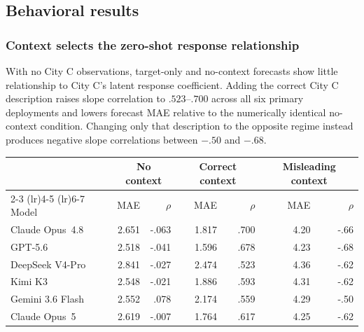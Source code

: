 \subsection{Behavioral results}
\label{app:coin-city-results}

\subsubsection{Context selects the zero-shot response relationship}

With no City C observations, target-only and no-context forecasts show little relationship to City C's latent response coefficient.
Adding the correct City C description raises slope correlation to \(.523\)--\(.700\) across all six primary deployments and lowers forecast MAE relative to the numerically identical no-context condition.
Changing only that description to the opposite regime instead produces negative slope correlations between \(-.50\) and \(-.68\).

\begin{center}
\begin{minipage}{\linewidth}
\centering
{}
\label{tab:coin-city-zero-shot}
\small
\begin{tabular}{l rr rr rr}
\toprule
& \multicolumn{2}{c}{No context} & \multicolumn{2}{c}{Correct context} & \multicolumn{2}{c}{Misleading context} \\
\cmidrule(lr){2-3}
\cmidrule(lr){4-5}
\cmidrule(lr){6-7}
Model & MAE & \(\rho\) & MAE & \(\rho\) & MAE & \(\rho\) \\
\midrule
Claude Opus~4.8 & 2.651 & -.063 & 1.817 & .700 & 4.20 & -.66 \\
GPT-5.6 & 2.518 & -.041 & 1.596 & .678 & 4.23 & -.68 \\
DeepSeek V4-Pro & 2.841 & -.027 & 2.474 & .523 & 4.36 & -.62 \\
Kimi K3 & 2.548 & -.021 & 1.886 & .593 & 4.31 & -.62 \\
Gemini 3.6 Flash & 2.552 & .078 & 2.174 & .559 & 4.29 & -.50 \\
Claude Opus~5 & 2.619 & -.007 & 1.764 & .617 & 4.25 & -.62 \\
\bottomrule
\end{tabular}
\end{minipage}
\end{center}

